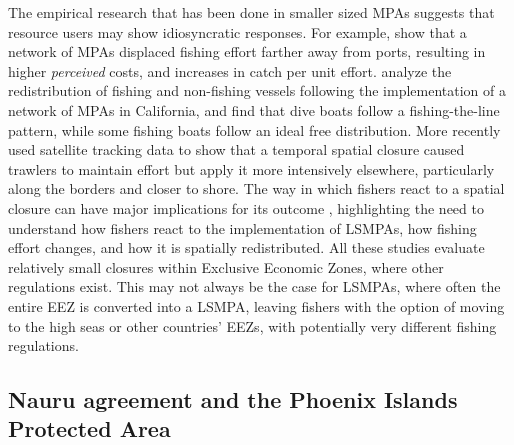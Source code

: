 \documentclass[9p,twocolumn,twoside,lineno]{pnas-new}
\begin{document}
The empirical research that has been done in smaller sized MPAs
suggests that resource users may show idiosyncratic responses. For
example, \cite{stevenson_2013} show that a network of MPAs displaced
fishing effort farther away from ports, resulting in higher
\emph{perceived} costs, and increases in catch per unit effort.
\cite{cabral_2017} analyze the redistribution of fishing and
non-fishing vessels following the implementation of a network of MPAs in
California, and find that dive boats follow a
fishing-the-line pattern, while some fishing boats follow an ideal free
distribution. More recently \cite{elahi_2018} used satellite tracking
data to show that a temporal spatial closure caused trawlers to maintain
effort but apply it more intensively elsewhere, particularly along the
borders and closer to shore. The way in which fishers react to a spatial
closure can have major implications for its outcome
\citep{smith_2003,hilborn_2006}, highlighting the need to understand how
fishers react to the implementation of LSMPAs, how fishing effort
changes, and how it is spatially redistributed. All these studies evaluate relatively small closures within Exclusive Economic Zones, where other regulations exist.
This may not always be the case for LSMPAs, where often the entire EEZ
is converted into a LSMPA, leaving fishers with the option of moving to
the high seas or other countries' EEZs, with potentially very different fishing regulations.

\subsection{Nauru agreement and the Phoenix Islands Protected Area}
\end{document}
